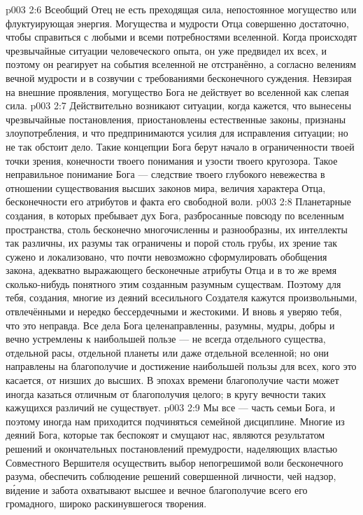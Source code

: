 \vs p003 2:6 \pc Всеобщий Отец не есть преходящая сила, непостоянное могущество или флуктуирующая энергия. Могущества и мудрости Отца совершенно достаточно, чтобы справиться с любыми и всеми потребностями вселенной. Когда происходят чрезвычайные ситуации человеческого опыта, он уже предвидел их всех, и поэтому он реагирует на события вселенной не отстранённо, а согласно велениям вечной мудрости и в созвучии с требованиями бесконечного суждения. Невзирая на внешние проявления, могущество Бога не действует во вселенной как слепая сила.
\vs p003 2:7 Действительно возникают ситуации, когда кажется, что вынесены чрезвычайные постановления, приостановлены естественные законы, признаны злоупотребления, и что предпринимаются усилия для исправления ситуации; но не так обстоит дело. Такие концепции Бога берут начало в ограниченности твоей точки зрения, конечности твоего понимания и узости твоего кругозора. Такое неправильное понимание Бога --- следствие твоего глубокого невежества в отношении существования высших законов мира, величия характера Отца, бесконечности его атрибутов и факта его свободной воли.
\vs p003 2:8 Планетарные создания, в которых пребывает дух Бога, разбросанные повсюду по вселенным пространства, столь бесконечно многочисленны и разнообразны, их интеллекты так различны, их разумы так ограничены и порой столь грубы, их зрение так сужено и локализовано, что почти невозможно сформулировать обобщения закона, адекватно выражающего бесконечные атрибуты Отца и в то же время сколько\hyp{}нибудь понятного этим созданным разумным существам. Поэтому для тебя, создания, многие из деяний всесильного Создателя кажутся произвольными, отвлечёнными и нередко бессердечными и жестокими. И вновь я уверяю тебя, что это неправда. Все дела Бога целенаправленны, разумны, мудры, добры и вечно устремлены к наибольшей пользе --- не всегда отдельного существа, отдельной расы, отдельной планеты или даже отдельной вселенной; но они направлены на благополучие и достижение наибольшей пользы для всех, кого это касается, от низших до высших. В эпохах времени благополучие части может иногда казаться отличным от благополучия целого; в кругу вечности таких кажущихся различий не существует.
\vs p003 2:9 Мы все --- часть семьи Бога, и поэтому иногда нам приходится подчиняться семейной дисциплине. Многие из деяний Бога, которые так беспокоят и смущают нас, являются результатом решений и окончательных постановлений премудрости, наделяющих властью Совместного Вершителя осуществить выбор непогрешимой воли бесконечного разума, обеспечить соблюдение решений совершенной личности, чей надзор, в\'идение и забота охватывают высшее и вечное благополучие всего его громадного, широко раскинувшегося творения.
